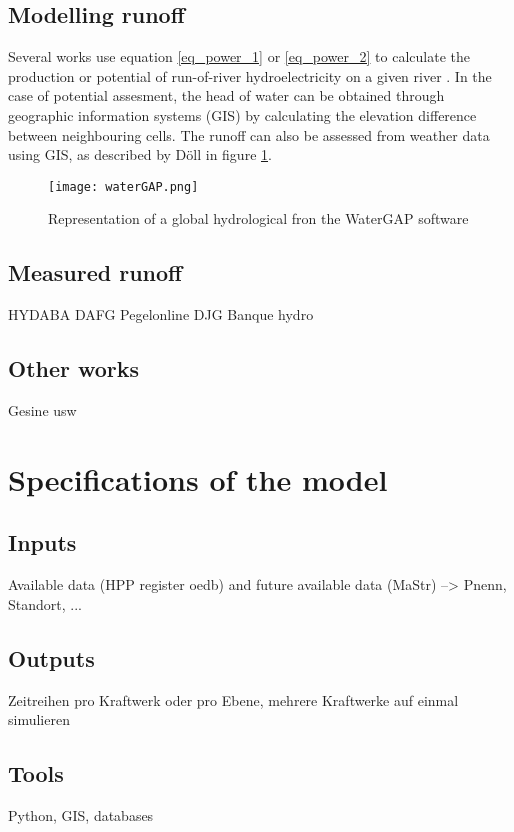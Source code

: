\subsection{Modelling runoff}
Several works use equation \ref{eq_power_1} or \ref{eq_power_2} to calculate the production or potential of run-of-river hydroelectricity on a given river \cite{hammid} \cite{bayazit} \cite{garrido}. In the case of potential assesment, the head of water can be obtained through geographic information systems (GIS) by calculating the elevation difference between neighbouring cells. The runoff can also be assessed from weather data using GIS, as described by Döll in figure \ref{waterGAP}.
\begin{figure}[h]
\texttt{[image: waterGAP.png]}
\caption[Representation of a global hydrological from the WaterGAP software]{Representation of a global hydrological fron the WaterGAP software \cite{doll}}
\centering
\label{waterGAP}
\end{figure}

\subsection{Measured runoff}
HYDABA
DAFG
Pegelonline
DJG
Banque hydro

\subsection{Other works}
Gesine usw

\section{Specifications of the model}

\subsection{Inputs}
Available data (HPP register oedb) and future available data (MaStr)
--> Pnenn, Standort, ...

\subsection{Outputs}
Zeitreihen pro Kraftwerk oder pro Ebene, mehrere Kraftwerke auf einmal simulieren


\subsection{Tools}
Python, GIS, databases